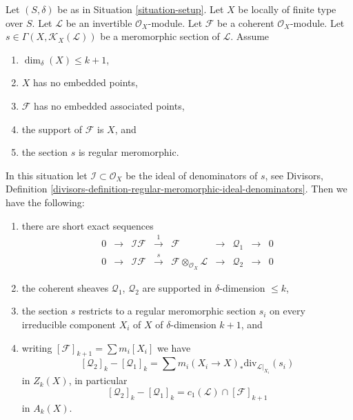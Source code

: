 \begin{lemma}
\label{lemma-no-embedded-points}
Let $(S, \delta)$ be as in Situation \ref{situation-setup}.
Let $X$ be locally of finite type over $S$.
Let $\mathcal{L}$ be an invertible $\mathcal{O}_X$-module.
Let $\mathcal{F}$ be a coherent $\mathcal{O}_X$-module.
Let $s \in \Gamma(X, \mathcal{K}_X(\mathcal{L}))$ be a
meromorphic section of $\mathcal{L}$.
Assume
\begin{enumerate}
\item $\dim_\delta(X) \leq k + 1$,
\item $X$ has no embedded points,
\item $\mathcal{F}$ has no embedded associated points,
\item the support of $\mathcal{F}$ is $X$, and
\item the section $s$ is regular meromorphic.
\end{enumerate}
In this situation let $\mathcal{I} \subset \mathcal{O}_X$
be the ideal of denominators of $s$, see
Divisors,
Definition \ref{divisors-definition-regular-meromorphic-ideal-denominators}.
Then we have the following:
\begin{enumerate}
\item there are short exact sequences
$$
\begin{matrix}
0 &
\to &
\mathcal{I}\mathcal{F} &
\xrightarrow{1} &
\mathcal{F} &
\to &
\mathcal{Q}_1 &
\to &
0 \\
0 &
\to &
\mathcal{I}\mathcal{F} &
\xrightarrow{s} &
\mathcal{F} \otimes_{\mathcal{O}_X} \mathcal{L} &
\to &
\mathcal{Q}_2 &
\to &
0
\end{matrix}
$$
\item the coherent sheaves $\mathcal{Q}_1$, $\mathcal{Q}_2$
are supported in $\delta$-dimension $\leq k$,
\item the section $s$ restricts to a regular meromorphic
section $s_i$ on every irreducible component $X_i$ of
$X$ of $\delta$-dimension $k + 1$, and
\item writing $[\mathcal{F}]_{k + 1} = \sum m_i[X_i]$ we have
$$
[\mathcal{Q}_2]_k - [\mathcal{Q}_1]_k
=
\sum m_i(X_i \to X)_*\text{div}_{\mathcal{L}|_{X_i}}(s_i)
$$
in $Z_k(X)$, in particular
$$
[\mathcal{Q}_2]_k - [\mathcal{Q}_1]_k
=
c_1(\mathcal{L}) \cap [\mathcal{F}]_{k + 1}
$$
in $A_k(X)$.
\end{enumerate}
\end{lemma}


